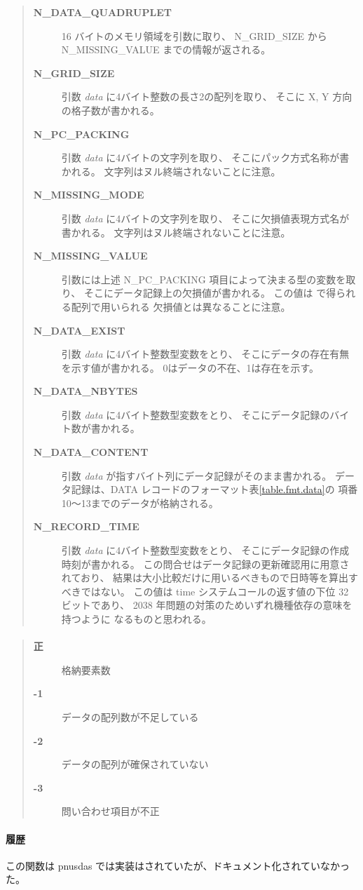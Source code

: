 \begin{quote}\begin{description}
\item[{\bf N\_DATA\_QUADRUPLET}] 
16 バイトのメモリ領域を引数に取り、 N\_GRID\_SIZE から
\newline N\_MISSING\_VALUE までの情報が返される。
\item[{\bf N\_GRID\_SIZE}] 
引数 {\it data} に4バイト整数の長さ2の配列を取り、
そこに X, Y 方向の格子数が書かれる。
\item[{\bf N\_PC\_PACKING}] 
引数 {\it data} に4バイトの文字列を取り、
そこにパック方式名称が書かれる。
文字列はヌル終端されないことに注意。
\item[{\bf N\_MISSING\_MODE}] 
引数 {\it data} に4バイトの文字列を取り、
そこに欠損値表現方式名が書かれる。
文字列はヌル終端されないことに注意。
\item[{\bf N\_MISSING\_VALUE}] 
引数には上述 N\_PC\_PACKING 項目によって決まる型の変数を取り、
そこにデータ記録上の欠損値が書かれる。
この値は  で得られる配列で用いられる
欠損値とは異なることに注意。
\item[{\bf N\_DATA\_EXIST}] 
引数 {\it data} に4バイト整数型変数をとり、
そこにデータの存在有無を示す値が書かれる。
0はデータの不在、1は存在を示す。
\item[{\bf N\_DATA\_NBYTES}] 
引数 {\it data} に4バイト整数型変数をとり、
そこにデータ記録のバイト数が書かれる。
\item[{\bf N\_DATA\_CONTENT}] 
引数 {\it data} が指すバイト列にデータ記録がそのまま書かれる。
データ記録は、DATA レコードのフォーマット表\ref{table.fmt.data}の
項番10〜13までのデータが格納される。
\item[{\bf N\_RECORD\_TIME}] 
引数 {\it data} に4バイト整数型変数をとり、
そこにデータ記録の作成時刻が書かれる。
この問合せはデータ記録の更新確認用に用意されており、
結果は大小比較だけに用いるべきもので日時等を算出すべきではない。
この値は time システムコールの返す値の下位 32 ビットであり、
2038 年問題の対策のためいずれ機種依存の意味を持つように
なるものと思われる。
\end{description}\end{quote}
\paragraph{\ResultCode}
\begin{quote}
\begin{description}
\item[{\bf 正}] 格納要素数
\item[{\bf -1}] データの配列数が不足している
\item[{\bf -2}] データの配列が確保されていない
\item[{\bf -3}] 問い合わせ項目が不正 
\end{description}\end{quote}
\paragraph{ 履歴 }
この関数は pnusdas では実装はされていたが、ドキュメント化されていなかった。
